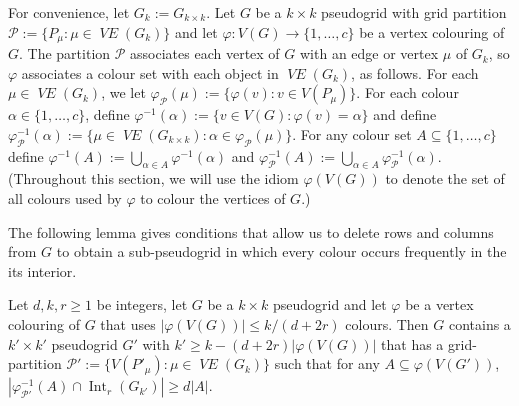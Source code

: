 \documentclass{patmorin}
\DeclareMathOperator{\interior}{Int}
\DeclareMathOperator{\VE}{\mathit{VE}}
\begin{document}
For convenience, let $G_k:=G_{k\times k}$.
Let $G$ be a $k\times k$ pseudogrid with grid partition $\mathcal{P}:=\{P_\mu:\mu\in\VE(G_{k})\}$ and let $\varphi:V(G)\to\{1,\ldots,c\}$ be a vertex colouring of $G$.  The partition $\mathcal{P}$ associates each vertex of $G$ with an edge or vertex $\mu$ of $G_k$, so $\varphi$ associates a colour set with each object in $\VE(G_k)$, as follows.  For each $\mu\in\VE(G_{k})$, we let $\varphi_{\mathcal{P}}(\mu):=\{\varphi(v):v\in V(P_\mu)\}$.  For each colour $\alpha\in\{1,\ldots,c\}$, define $\varphi^{-1}(\alpha):=\{v\in V(G):\varphi(v)=\alpha\}$ and define $\varphi_\mathcal{P}^{-1}(\alpha):=\{\mu\in \VE(G_{k\times k}):\alpha\in\varphi_\mathcal{P}(\mu)\}$.  For any colour set $A\subseteq\{1,\ldots,c\}$ define $\varphi^{-1}(A):=\bigcup_{\alpha\in A}\varphi^{-1}(\alpha)$ and $\varphi_\mathcal{P}^{-1}(A):=\bigcup_{\alpha\in A}\varphi_{\mathcal{P}}^{-1}(\alpha)$.  (Throughout this section, we will use the idiom $\varphi(V(G))$ to denote the set of all colours used by $\varphi$ to colour the vertices of $G$.)

The following lemma gives conditions that allow us to delete rows and columns from $G$ to obtain a sub-pseudogrid in which every colour occurs frequently in the its interior.


\begin{lem}\label{only_frequent}
  Let $d,k,r\ge 1$ be integers, let $G$ be a $k\times k$ pseudogrid and let $\varphi$ be a vertex colouring of $G$ that uses $|\varphi(V(G))|\le k/(d+2r)$ colours.
  Then $G$ contains a $k'\times k'$ pseudogrid $G'$ with $k'\ge k - (d+2r)|\varphi(V(G))|$ that has a grid-partition $\mathcal{P}':=\{V(P'_\mu):\mu\in \VE(G_{k})\}$ such that
  for any $A\subseteq \varphi(V(G'))$, $|\varphi_{\mathcal{P}'}^{-1}(A)\cap \interior_r(G_{k'})| \ge d|A|$.
\end{lem}
\end{document}
